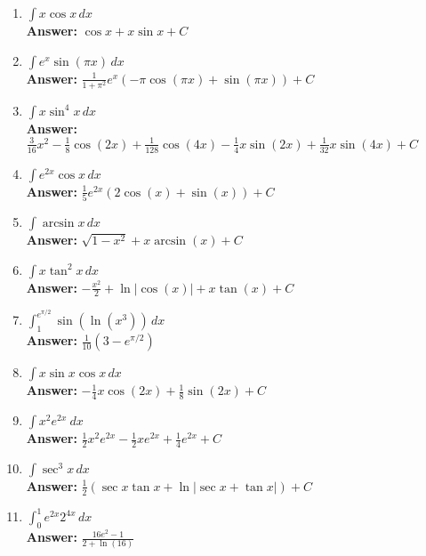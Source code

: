 \documentclass[letterpaper]{article}
\begin{document}
\begin{enumerate}
\begin{enumerate}
	\item $\int x\cos x\,dx$
	\\ \textbf{Answer:} $\cos x + x\sin x +C$

	\item $\int e^x \sin (\pi x)\,dx$
	\\ \textbf{Answer:} $\frac1{1+\pi^2} e^x(-\pi \cos(\pi x)+\sin(\pi x))+C$

	\item $\int x \sin^4 x\,dx$
	\\ \textbf{Answer:} $\frac{3}{16}x^2-\frac{1}{8} \cos(2 x)+\frac{1}{128} \cos(4 x)-\frac{1}{4} x \sin(2 x)+\frac{1}{32} x \sin(4 x)+C$

	\item $\int e^{2x} \cos x \,dx$
	\\ \textbf{Answer:} $\frac{1}{5} e^{2 x} (2 \cos(x)+\sin(x))+C$

	\item $\int \arcsin x \, dx$
	\\ \textbf{Answer:} $\sqrt{1-x^2}+x \arcsin(x)+C$

	\item $\int x \tan^2 x\,dx$
	\\ \textbf{Answer:} $-\frac{x^2}{2}+\ln|\cos(x)|+x \tan(x)+C$

	\item $\int_1^{e^{\pi/2}} \sin (\ln (x^3))\,dx$
	\\ \textbf{Answer:} $\frac{1}{10} \left(3-e^{\pi /2}\right)$

	\item $\int x \sin x \cos x\,dx$
	\\ \textbf{Answer:} $-\frac{1}{4} x \cos(2 x)+\frac{1}{8} \sin(2 x)+C$

	\item $\int x^2 e^{2x}~dx$
	\\ \textbf{Answer:} $\frac12 x^2 e^{2x}- \frac12xe^{2x}+\frac14e^{2x}+C$

	\item $\int \sec^3 x\,dx$
	\\ \textbf{Answer:} $\frac{1}{2}\left(\sec x \tan x + \ln | \sec x + \tan x| \right)+C$

	\item $\int_0^1 e^{2x}2^{4x}\,dx$
	\\ \textbf{Answer:} $\frac{16e^2-1}{2+\ln(16)}$


\end{enumerate}
\end{enumerate}
\end{document}
